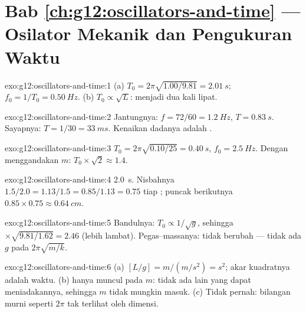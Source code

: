 \section*{Bab \ref{ch:g12:oscillators-and-time} --- Osilator Mekanik dan Pengukuran Waktu}

\begin{solution}{exo:g12:oscillators-and-time:1}
(a) $T_0 = 2\pi\sqrt{1.00/9.81} = \qty{2.01}{s}$;
$f_0 = 1/T_0 = \qty{0.50}{Hz}$. (b) $T_0 \propto \sqrt{L}$:
 menjadi dua kali lipat.
\end{solution}

\begin{solution}{exo:g12:oscillators-and-time:2}
Jantungnya: $f = 72/60 = \qty{1.2}{Hz}$, $T = \qty{0.83}{s}$. Sayapnya:
$T = 1/30 = \qty{33}{ms}$. Kenaikan dadanya adalah \emph{}.
\end{solution}

\begin{solution}{exo:g12:oscillators-and-time:3}
$T_0 = 2\pi\sqrt{0.10/25} = \qty{0.40}{s}$, $f_0 = \qty{2.5}{Hz}$.
Dengan menggandakan $m$: $T_0 \times \sqrt{2} \approx 1.4$.
\end{solution}

\begin{solution}{exo:g12:oscillators-and-time:4}
 \qty{2.0}{s}. Nisbahnya $1.5/2.0 = 1.13/1.5 = 0.85/1.13
= 0.75$ tiap ; puncak berikutnya $0.85 \times 0.75 \approx
\qty{0.64}{cm}$.
\end{solution}

\begin{solution}{exo:g12:oscillators-and-time:5}
Bandulnya: $T_0 \propto 1/\sqrt{g}$, sehingga $\times\sqrt{9.81/1.62} =
2.46$ (lebih lambat). Pegas--massanya: tidak berubah --- tidak ada $g$ pada
$2\pi\sqrt{m/k}$.
\end{solution}

\begin{solution}{exo:g12:oscillators-and-time:6}
(a) $[L/g] = \unit{m}/(\unit{m/s^2}) = \unit{s^2}$; akar kuadratnya
adalah waktu. (b)  hanya muncul pada $m$: tidak ada lain yang dapat
meniadakannya, sehingga $m$ tidak mungkin masuk. (c) Tidak pernah: bilangan
murni seperti $2\pi$ tak terlihat oleh dimensi.
\end{solution}

